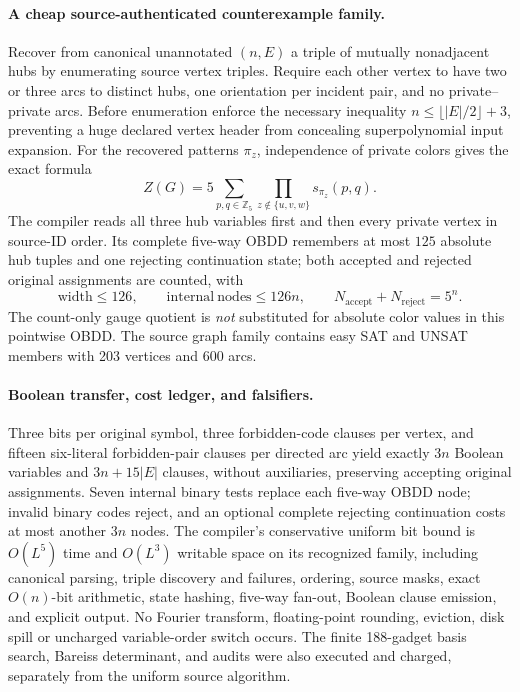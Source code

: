 \documentclass[11pt]{article}
\begin{document}
\paragraph{A cheap source-authenticated counterexample family.}
Recover from canonical unannotated $(n,E)$ a triple of mutually
nonadjacent hubs by enumerating source vertex triples. Require each
other vertex to have two or three arcs to distinct hubs, one
orientation per incident pair, and no private--private arcs.
Before enumeration enforce the necessary inequality
$n\le\lfloor |E|/2\rfloor+3$, preventing a huge
declared vertex header from concealing superpolynomial input expansion.
For the recovered patterns $\pi_z$, independence of private colors
gives the exact formula
\[
 Z(G)=5\sum_{p,q\in\mathbb{Z}_5}
           \prod_{z\notin\{u,v,w\}}s_{\pi_z}(p,q).
\]
The compiler reads all three hub variables first and then every
private vertex in source-ID order. Its complete five-way OBDD
remembers at most $125$ absolute hub tuples and one rejecting
continuation state; both accepted and rejected original assignments
are counted, with
\[
 \mathrm{width}\le126,\qquad
 \mathrm{internal\ nodes}\le126n,\qquad
 N_{\mathrm{accept}}+N_{\mathrm{reject}}=5^n.
\]
The count-only gauge quotient is \emph{not} substituted for absolute
color values in this pointwise OBDD. The source graph family contains
easy SAT and UNSAT members with 203 vertices and 600 arcs.

\paragraph{Boolean transfer, cost ledger, and falsifiers.}
Three bits per original symbol, three forbidden-code clauses per
vertex, and fifteen six-literal forbidden-pair clauses per directed
arc yield exactly $3n$ Boolean variables and $3n+15|E|$ clauses,
without auxiliaries, preserving accepting original assignments.
Seven internal binary tests replace each five-way OBDD node;
invalid binary codes reject, and an optional complete rejecting
continuation costs at most another $3n$ nodes. The compiler's
conservative uniform bit bound is $O(L^5)$ time and $O(L^3)$ writable
space on its recognized family, including canonical parsing,
triple discovery and failures, ordering, source masks, exact
$O(n)$-bit arithmetic, state hashing, five-way fan-out, Boolean
clause emission, and explicit output. No Fourier transform,
floating-point rounding, eviction, disk spill or uncharged
variable-order switch occurs. The finite 188-gadget basis
search, Bareiss determinant, and audits were also executed and
charged, separately from the uniform source algorithm.
\end{document}

